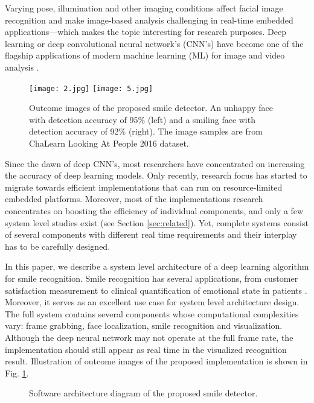 \documentclass[conference]{IEEEtran}
\begin{document}
 Varying pose, illumination and other imaging conditions affect facial image recognition and make image-based analysis challenging in real-time embedded applications---which makes the topic interesting for research purposes. Deep learning or deep convolutional neural network’s (CNN’s) have become one of the flagship applications of modern machine learning (ML) for image and video analysis \cite{a5}. 
 
 \begin{figure}[t]
\centering
\texttt{[image: 2.jpg]}
\texttt{[image: 5.jpg]}
\caption{Outcome images of the proposed smile detector. An unhappy face with detection accuracy of 95\% (left) and a smiling face with detection accuracy of 92\% (right). The image samples are from ChaLearn Looking At People 2016 dataset.}\label{fig:image1}
\end{figure}

 Since the dawn of deep CNN’s, most researchers have concentrated on increasing the accuracy of deep learning models. Only recently, research focus has started to migrate towards efficient implementations \cite{mobilenets,squeeze} that can run on resource-limited embedded platforms. Moreover, most of the implementations research concentrates on boosting the efficiency of individual components, and only a few system level studies exist (see Section \ref{sec:related}). Yet, complete systems consist of several components with different real time requirements and their interplay has to be carefully designed.
 
 In this paper, we describe a system level architecture of a deep learning algorithm for smile recognition. Smile recognition has several applications, from customer satisfaction measurement \cite{product} to clinical quantiﬁcation of emotional state in patients \cite{tur2018}. Moreover, it serves as an excellent use case for system level architecture design. The full system contains several components whose computational complexities vary: frame grabbing, face localization, smile recognition and visualization. Although the deep neural network may not operate at the full frame rate, the implementation should still appear as real time in the visualized recognition result. Illustration of outcome images of the proposed implementation is shown in Fig. \ref{fig:image1}.
 
\begin{figure*}[!b]
\vspace{1mm}
\caption{Software architecture diagram of the proposed smile detector.}\label{fig:diagram}
\end{figure*}
 
\end{document}
